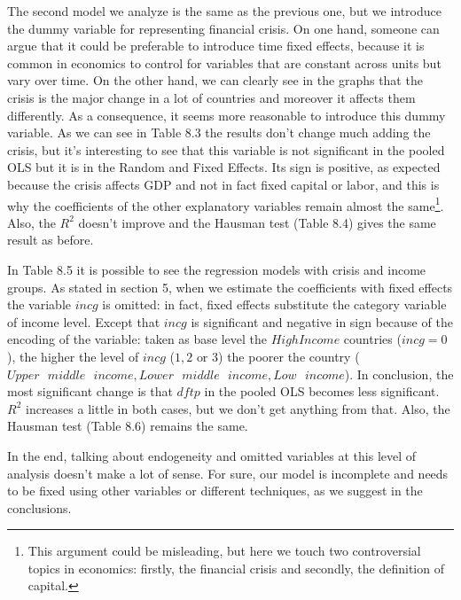 \documentclass[12pt, letterpaper]{article}
\numberwithin{table}{section}   %
\begin{document}
The second model we analyze is the same as the previous one, but we introduce the dummy variable for representing financial crisis. On one hand, someone can argue that it could be preferable to introduce time fixed effects, because it is common in economics to control for variables that are constant across units but vary over time. On the other hand, we can clearly see in the graphs that the crisis is the major change in a lot of countries and moreover it affects them differently. As a consequence, it seems more reasonable to introduce this dummy variable. 
As we can see in Table 8.3 the results don't change much adding the crisis, but it's interesting to see that this variable is not significant in the pooled OLS but it is in the Random and Fixed Effects. Its sign is positive, as expected because the crisis affects GDP and not in fact fixed capital or labor, and this is why the coefficients of the other explanatory variables remain almost the same\footnote{This argument could be misleading, but here we touch two controversial topics in economics: firstly, the financial crisis and secondly, the definition of capital.}. Also, the $R^2$ doesn't improve and the Hausman test (Table 8.4) gives the same result as before.

In Table 8.5 it is possible to see the regression models with crisis and income groups. As stated in section 5, when we estimate the coefficients with fixed effects the variable $incg$ is omitted: in fact, fixed effects substitute the category variable of income level. Except that $incg$ is significant and negative in sign because of the encoding of the variable: taken as base level the $High Income$ countries ($incg = 0$), the higher the level of $incg$ ($1,2 \text{ or } 3$) the poorer the country ($Upper\text{ }middle\text{ } income, Lower\text{ } middle\text{ } income, Low\text{ } income$). In conclusion, the most significant change is that $dftp$ in the pooled OLS becomes less significant. $R^2$ increases a little in both cases, but we don't get anything from that. Also, the Hausman test (Table 8.6) remains the same.

In the end, talking about endogeneity and omitted variables at this level of analysis doesn't make a lot of sense. For sure, our model is incomplete and needs to be fixed using other variables or different techniques, as we suggest in the conclusions.
\end{document}
